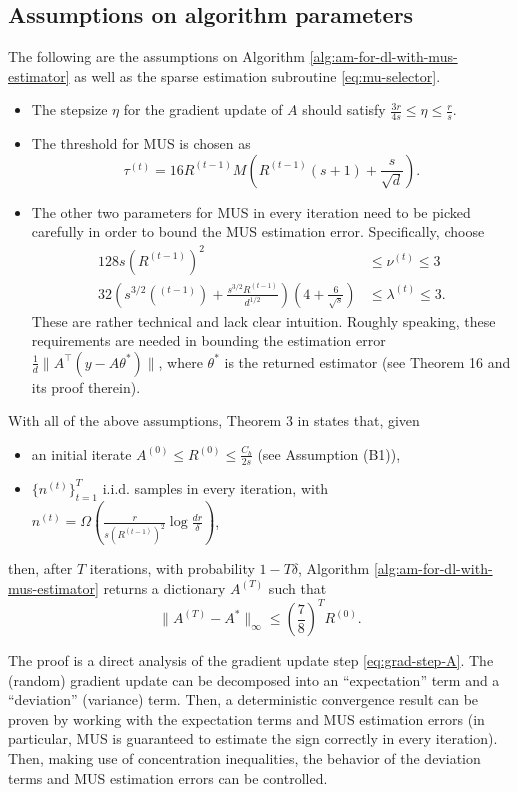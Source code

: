 \subsection{Assumptions on algorithm parameters}
The following are the assumptions on Algorithm \ref{alg:am-for-dl-with-mus-estimator} as well as the sparse estimation subroutine \ref{eq:mu-selector}.
\begin{itemize}
    \item The stepsize $\eta$ for the gradient update of $A$ should satisfy $\frac{3r}{4s}\leq \eta \leq \frac{r}{s}$.
    \item The threshold for MUS is chosen as \[\tau^{(t)} = 16 R^{(t-1)} M\left(R^{(t-1)} (s+1)  + \frac{s}{\sqrt{d}} \right).\]
    \item The other two parameters for MUS in every iteration need to be picked carefully in order to bound the MUS estimation error. Specifically, choose
    \begin{align*}
        128s \left(R^{(t-1)}\right)^2 & \leq \nu^{(t)} \leq 3 \\
        32 \left( s^{3/2} \left(^{(t-1)}\right) + \frac{s^{3/2}R^{(t-1)}}{d^{1/2}} \right)\left( 4 + \frac{6}{\sqrt{s}} \right) &\leq \lambda^{(t)} \leq 3. 
    \end{align*}
    These are rather technical and lack clear intuition. Roughly speaking, these requirements are needed in bounding the estimation error $\frac{1}{d}\|A^\top (y - A \theta^*)\|$, where $\theta^*$ is the returned estimator (see Theorem 16 and its proof therein).
    \end{itemize}
    
With all of the above assumptions, Theorem 3 in \cite{chatterji2017alternating} states that, given 
\begin{itemize}
    \item an initial iterate $A^{(0)}\leq R^{(0)} \leq \frac{C_b}{2s}$ (see Assumption (B1)), 
    \item $\{ n^{(t)}\}_{t=1}^T$ i.i.d. samples in every iteration, with $n^{(t)} = \Omega\left(\frac{r}{s(R^{(t-1)})^2} \log \frac{dr}{\delta} \right)$, 
\end{itemize}
then, after $T$ iterations, with probability $1 - T\delta$, Algorithm \ref{alg:am-for-dl-with-mus-estimator} returns a dictionary $A^{(T)}$ such that \[ \|A^{(T)} - A^*\|_\infty \leq \left(\frac{7}{8}\right)^T R^{(0)}. \]

The proof is a direct analysis of the gradient update step \eqref{eq:grad-step-A}. The (random) gradient update can be decomposed into
an ``expectation'' term and a ``deviation'' (variance) term.
Then, a deterministic convergence result can be proven by working with the expectation terms and MUS estimation errors (in particular, MUS is guaranteed to estimate the sign correctly in every iteration). Then, making use of concentration inequalities, the behavior of the deviation terms and MUS estimation errors can be controlled.

